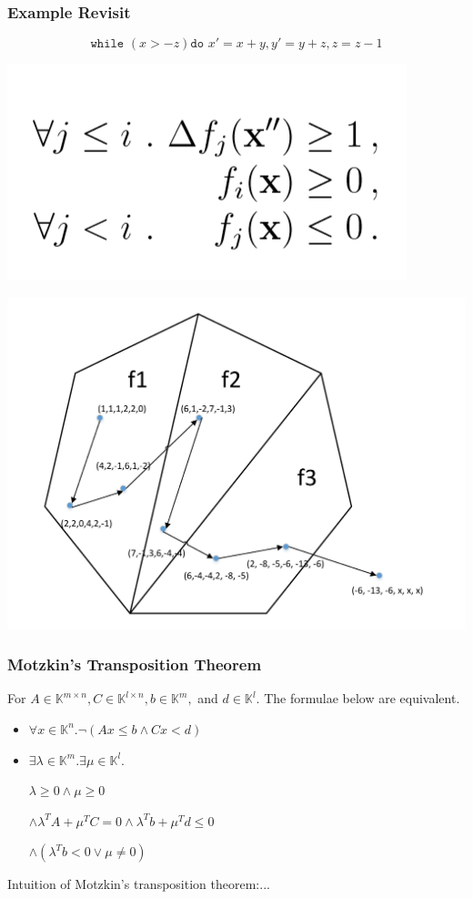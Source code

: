 \documentclass[11pt]{beamer}
\begin{document}
\begin{frame}\frametitle{Example Revisit}
\[\texttt{while }( x > -z) \texttt{do } x' = x + y, y' = y + z, z = z - 1\]

\begin{center}
\includegraphics[scale = 0.2]{3.PNG}

\includegraphics[scale = 0.4]{3.pdf}
\end{center}
\end{frame}




\begin{frame}\frametitle{Motzkin's Transposition Theorem}
\begin{theorem}
For $A\in \mathbb{K}^{m\times n}, C\in \mathbb{K}^{l\times n}, b\in \mathbb{K}^m, $ and $d\in \mathbb{K}^l$. The formulae below are equivalent.
\begin{itemize}
\item $\forall x \in \mathbb{K}^n. \neg (Ax\le b \wedge Cx < d)$

\item $\exists \lambda \in \mathbb{K}^m. \exists \mu \in \mathbb{K}^l.$

$\lambda \ge 0 \wedge \mu \ge 0$

$\wedge \lambda^{T}A + \mu^TC = 0 \wedge \lambda^{T}b + \mu^Td \le 0 $

$\wedge (\lambda^Tb < 0 \vee \mu \ne 0)$

\end{itemize}
\end{theorem}


Intuition of Motzkin's transposition theorem:...
\end{frame}
\end{document}
